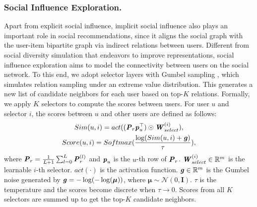 \documentclass[letterpaper]{article} %
\begin{document}
\subsubsection{Social Influence Exploration.}
Apart from explicit social influence, implicit social influence also plays an important role in social recommendations, since it aligns the social graph with the user-item bipartite graph via indirect relations between users. Different from social diversity simulation that endeavors to improve representations, social influence exploration aims to model the connectivity between users on the social network. To this end, we adopt selector layers with Gumbel sampling \cite{gumbel,ESRF}, which simulates relation sampling under an extreme value distribution.
This generates a new list of candidate neighbors for each user based on top-$K$ relations. Formally, we apply $K$ selectors to compute the scores between users. For user $u$ and selector $i$, the scores between $u$ and other users are defined as follows:
\begin{gather}
    Sim(u, i) = act((\textbf{\textit{P}}_r \textbf{\textit{p}}_u^{\top})\odot \textbf{\textit{W}}_{select}^{(i)}),\\
    Score(u, i) = Softmax(\frac{\log(Sim(u, i)+\textbf{\textit{g}})}{\tau}),
\end{gather}
where $\textbf{\textit{P}}_r=\frac{1}{L+1}\sum_{l=0}^{L}{\textbf{\textit{P}}^{(l)}_r}$ and $\textbf{\textit{p}}_u$ is the $u$-th row of $\textbf{\textit{P}}_r$. $\textbf{\textit{W}}_{select}^{(i)} \in \mathbb{R}^m$ is the learnable $i$-th selector. $act(\cdot)$ is the activation function. $\textbf{\textit{g}} \in \mathbb{R}^{m}$ is the Gumbel noise generated by $\textbf{\textit{g}}=-\log(-\log(\boldsymbol{\mu}))$, where $\boldsymbol{\mu} \sim \mathcal{N}(0,\textbf{I})$. $\tau$ is the temperature and the scores become discrete when $\tau \rightarrow 0$. Scores from all $K$ selectors are summed up to get the top-$K$ candidate neighbors.
\end{document}
